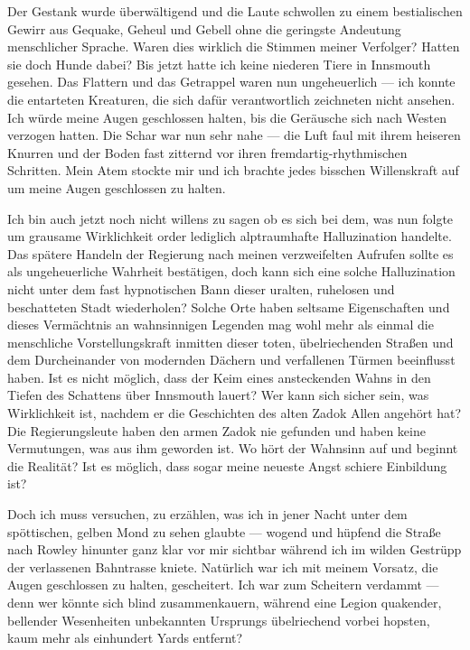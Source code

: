 Der Gestank wurde überwältigend und die Laute schwollen zu einem bestialischen Gewirr aus Gequake, Geheul und Gebell ohne die geringste Andeutung menschlicher Sprache. Waren dies wirklich die Stimmen meiner Verfolger? Hatten sie doch Hunde dabei? Bis jetzt hatte ich keine niederen Tiere in Innsmouth gesehen. Das Flattern und das Getrappel waren nun ungeheuerlich --- ich konnte die entarteten Kreaturen, die sich dafür verantwortlich zeichneten nicht ansehen. Ich würde meine Augen geschlossen halten, bis die Geräusche sich nach Westen verzogen hatten. Die Schar war nun sehr nahe --- die Luft faul mit ihrem heiseren Knurren und der Boden fast zitternd vor ihren fremdartig-rhythmischen Schritten. Mein Atem stockte mir und ich brachte jedes bisschen Willenskraft auf um meine Augen geschlossen zu halten.

Ich bin auch jetzt noch nicht willens zu sagen ob es sich bei dem, was nun folgte um grausame Wirklichkeit order lediglich alptraumhafte Halluzination handelte. Das spätere Handeln der Regierung nach meinen verzweifelten Aufrufen sollte es als ungeheuerliche Wahrheit bestätigen, doch kann sich eine solche Halluzination nicht unter dem fast hypnotischen Bann dieser uralten, ruhelosen und beschatteten Stadt wiederholen? Solche Orte haben seltsame Eigenschaften und dieses Vermächtnis an wahnsinnigen Legenden mag wohl mehr als einmal die menschliche Vorstellungskraft inmitten dieser toten, übelriechenden Straßen und dem Durcheinander von modernden Dächern und verfallenen Türmen beeinflusst haben.  Ist es nicht möglich, dass der Keim eines ansteckenden Wahns in den Tiefen des Schattens über Innsmouth lauert? Wer kann sich sicher sein, was Wirklichkeit ist, nachdem er die Geschichten des alten Zadok Allen angehört hat? Die Regierungsleute haben den armen Zadok nie gefunden und haben keine Vermutungen, was aus ihm geworden ist. Wo hört der Wahnsinn auf und beginnt die Realität? Ist es möglich, dass sogar meine neueste Angst schiere Einbildung ist?

Doch ich muss versuchen, zu erzählen, was ich in jener Nacht unter dem spöttischen, gelben Mond zu sehen glaubte --- wogend und hüpfend die Straße nach Rowley hinunter ganz klar vor mir sichtbar während ich im wilden Gestrüpp der verlassenen Bahntrasse kniete. Natürlich war ich mit  meinem Vorsatz, die Augen geschlossen zu halten, gescheitert. Ich war zum Scheitern verdammt --- denn wer könnte sich blind zusammenkauern, während eine Legion quakender, bellender Wesenheiten unbekannten Ursprungs übelriechend vorbei hopsten, kaum mehr als einhundert Yards entfernt?

